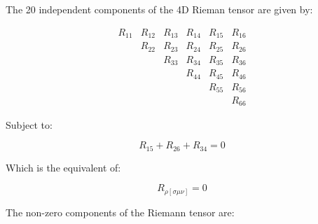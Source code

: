\documentclass{article}
\begin{document}
The 20 independent components of the 4D Rieman tensor are given by:
\begin{center}
\begin{equation}
\begin{array}{cccccc}
R_{11} & R_{12} & R_{13} & R_{14} & R_{15} & R_{16} \\ & R_{22} & R_{23} & R_{24} & R_{25} & R_{26} \\ & & R_{33} & R_{34} & R_{35} & R_{36} \\ & & & R_{44} & R_{45} & R_{46} \\ & & & & R_{55} & R_{56} \\ & & & & & R_{66}
\end{array}
\end{equation}
\end{center}
Subject to:
\begin{center}
\begin{equation}
R_{15} + R_{26} + R_{34} = 0
\end{equation}
\end{center}
Which is the equivalent of:
\begin{center}
\begin{equation}
R_{\rho[\sigma\mu\nu]}=0
\end{equation}
\end{center}
The non-zero components of the Riemann tensor are:
\end{document}
